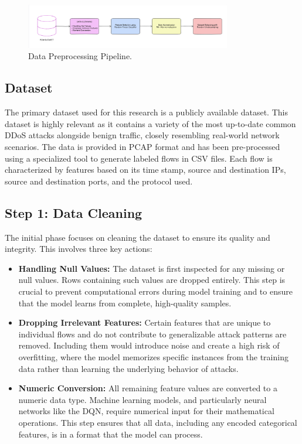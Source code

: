 \documentclass[12pt]{report}
\begin{document}
\begin{figure}[htbp]
    \centering
    \includegraphics[width=0.8\textwidth]{images/dataset-preprocessing.png}
    \caption{Data Preprocessing Pipeline.}
    \label{fig:dataset-preprocessing}
\end{figure}


\subsection{Dataset}

The primary dataset used for this research is a publicly available dataset. This dataset is highly relevant as it contains a variety of the most up-to-date common DDoS attacks alongside benign traffic, closely resembling real-world network scenarios. The data is provided in PCAP format and has been pre-processed using a specialized tool to generate labeled flows in CSV files. Each flow is characterized by features based on its time stamp, source and destination IPs, source and destination ports, and the protocol used.

\subsection{Step 1: Data Cleaning}
The initial phase focuses on cleaning the dataset to ensure its quality and integrity. This involves three key actions:

\begin{itemize}
    \item \textbf{Handling Null Values:} The dataset is first inspected for any missing or null values. Rows containing such values are dropped entirely. This step is crucial to prevent computational errors during model training and to ensure that the model learns from complete, high-quality samples.

    \item \textbf{Dropping Irrelevant Features:} Certain features that are unique to individual flows and do not contribute to generalizable attack patterns are removed. Including them would introduce noise and create a high risk of overfitting, where the model memorizes specific instances from the training data rather than learning the underlying behavior of attacks.

    \item \textbf{Numeric Conversion:} All remaining feature values are converted to a numeric data type. Machine learning models, and particularly neural networks like the DQN, require numerical input for their mathematical operations. This step ensures that all data, including any encoded categorical features, is in a format that the model can process.
\end{itemize}
\end{document}
